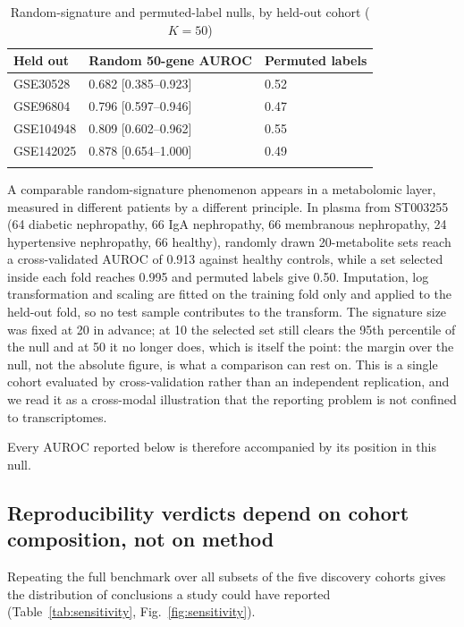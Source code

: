 \documentclass[pdflatex,sn-vancouver-num]{sn-jnl}
\theoremstyle{thmstyleone}
\theoremstyle{thmstyletwo}
\theoremstyle{thmstylethree}
\begin{document}
\begin{table}[h]
\caption{Random-signature and permuted-label nulls, by held-out cohort ($K = 50$)}\label{tab:null}
\begin{tabular}{@{}lll@{}}
\toprule
Held out & Random 50-gene AUROC & Permuted labels \\
\midrule
GSE30528  & 0.682 [0.385--0.923] & 0.52 \\
GSE96804  & 0.796 [0.597--0.946] & 0.47 \\
GSE104948 & 0.809 [0.602--0.962] & 0.55 \\
GSE142025 & 0.878 [0.654--1.000] & 0.49 \\
\botrule
\end{tabular}
\end{table}

A comparable random-signature phenomenon appears in a metabolomic layer, measured in
different patients by a different principle. In plasma from ST003255 (64 diabetic
nephropathy, 66 IgA nephropathy, 66 membranous nephropathy, 24 hypertensive nephropathy,
66 healthy), randomly drawn 20-metabolite sets reach a cross-validated AUROC of 0.913
against healthy controls, while a set selected inside each fold reaches 0.995 and permuted
labels give 0.50. Imputation, log transformation and scaling are fitted on the training
fold only and applied to the held-out fold, so no test sample contributes to the transform.
The signature size was fixed at 20 in advance; at 10 the selected set still clears the 95th
percentile of the null and at 50 it no longer does, which is itself the point: the margin
over the null, not the absolute figure, is what a comparison can rest on. This is a single
cohort evaluated by cross-validation rather than an independent replication, and we read it
as a cross-modal illustration that the reporting problem is not confined to transcriptomes.

Every AUROC reported below is therefore accompanied by its position in this null.

\subsection{Reproducibility verdicts depend on cohort composition, not on
method}\label{sec:sensitivity}

Repeating the full benchmark over all subsets of the five discovery cohorts gives the
distribution of conclusions a study could have reported (Table~\ref{tab:sensitivity},
Fig.~\ref{fig:sensitivity}).
\end{document}
